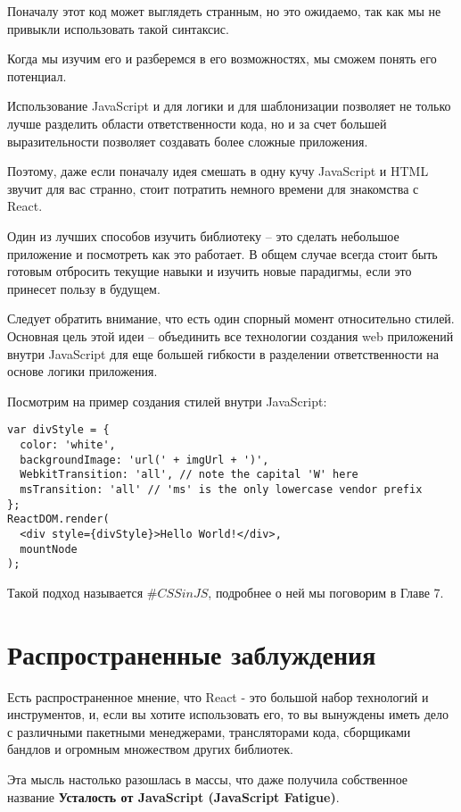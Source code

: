 Поначалу этот код может выглядеть странным, но это ожидаемо, так как мы не привыкли использовать такой синтаксис.

Когда мы изучим его и разберемся в его возможностях, мы сможем понять его потенциал.

Использование JavaScript и для логики и для шаблонизации позволяет не только лучше разделить области ответственности кода, но и за счет большей выразительности позволяет создавать более сложные приложения.

Поэтому, даже если поначалу идея смешать в одну кучу JavaScript и HTML звучит для вас странно, стоит потратить немного времени для знакомства с React.

Один из лучших способов изучить библиотеку -- это сделать небольшое приложение и посмотреть как это работает. В общем случае всегда стоит быть готовым отбросить текущие навыки и изучить новые парадигмы, если это принесет пользу в будущем.

Следует обратить внимание, что есть один спорный момент относительно стилей. Основная цель этой идеи -- объединить все технологии создания web приложений внутри JavaScript для еще большей гибкости в разделении ответственности на основе логики приложения.

Посмотрим на пример создания стилей внутри JavaScript:

\begin{lstlisting}
var divStyle = {
  color: 'white',
  backgroundImage: 'url(' + imgUrl + ')',
  WebkitTransition: 'all', // note the capital 'W' here
  msTransition: 'all' // 'ms' is the only lowercase vendor prefix
};
ReactDOM.render(
  <div style={divStyle}>Hello World!</div>,
  mountNode
);
\end{lstlisting}

Такой подход называется $\#CSSinJS$, подробнее о ней мы поговорим в Главе 7.

\section{Распространенные заблуждения}

Есть распространенное мнение, что React - это большой набор технологий и инструментов, и, если вы хотите использовать его, то вы вынуждены иметь дело с различными пакетными менеджерами, трансляторами кода, сборщиками бандлов и огромным множеством других библиотек.

Эта мысль настолько разошлась в массы, что даже получила собственное название \textbf{Усталость от JavaScript (JavaScript Fatigue)}.

